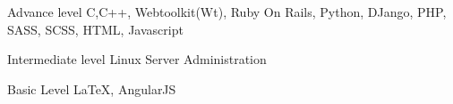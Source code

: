 \cventry{}
    {Advance level}
    {}
    {C,C++, Webtoolkit(Wt), Ruby On Rails, Python, DJango, PHP, SASS, SCSS, HTML, Javascript}
    {}
    {}

\cventry{}
    {Intermediate level}
    {}
    {Linux Server Administration}
    {}
    {}

\cventry{}
    {Basic Level}
    {}
    {\LaTeX, AngularJS}
    {}
    {}